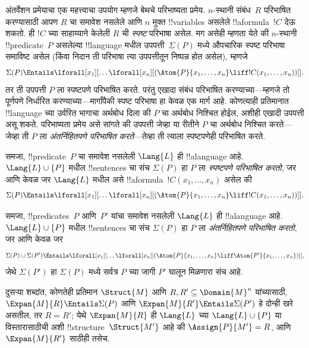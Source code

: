 \documentclass[../../../include/open-logic-section]{subfiles}
\begin{document}


अंतर्वेशन प्रमेयाचा एक महत्त्वाचा उपयोग म्हणजे बेथचे परिभाष्यता प्रमेय.
$n$-स्थानी संबंध~$R$ परिभाषित करण्यासाठी आपण $R$ चा समावेश नसलेले आणि
$n$ मुक्त !!{variable}s असलेले !!a{formula}~$!C$ देऊ शकतो. ही $!C$ च्या
साहाय्याने केलेली $R$ ची \emph{स्पष्ट} परिभाषा असेल. मग असेही म्हणता येते
की $n$-स्थानी !!{predicate}~$P$ असलेल्या !!{language} मधील
उपपत्ती~$\Sigma(P)$ मध्ये औपचारिक स्पष्ट परिभाषा समाविष्ट असेल (किंवा निदान
ती परिभाषा त्या उपपत्तीतून निष्पन्न होत असेल), म्हणजे
\[
\Sigma(P) \Entails \lforall[x_1][\dots
  \lforall[x_n][(\Atom{P}{x_1,\dots, x_n} \liff !C(x_1, \dots,
    x_n))]].
\]
तर ती उपपत्ती $P$ ला स्पष्टपणे परिभाषित करते. परंतु एखादा संबंध
परिभाषित करण्याच्या---म्हणजे तो पूर्णपणे निर्धारित करण्याच्या---मार्गांपैकी
स्पष्ट परिभाषा हा केवळ एक मार्ग आहे. कोणत्याही प्रतिमानात !!{language} च्या उर्वरित भागाचा अर्थबोध
दिला की $P$ चा अर्थबोध निश्चित होईल, अशीही एखादी उपपत्ती असू शकते.
परिभाष्यता प्रमेय असे सांगते की उपपत्ती जेव्हा या रीतीने $P$ चा अर्थबोध
निश्चित करते---जेव्हा ती $P$ ला \emph{अंतर्निहितपणे परिभाषित करते}---तेव्हा
ती त्याला स्पष्टपणेही परिभाषित करते.

\begin{defn}
समजा, !!{predicate}~$P$ चा समावेश नसलेली $\Lang{L}$ ही !!a{language} आहे. $\Lang{L}
\cup \{P\}$ मधील !!{sentence}s चा संच $\Sigma(P)$ हा $P$ ला
\emph{स्पष्टपणे परिभाषित करतो}, जर आणि केवळ जर $\Lang{L}$ मधील असे
!!a{formula}~$!C(x_1, \dots, x_n)$ असेल की
\[
\Sigma(P) \Entails \lforall[x_1][\dots
  \lforall[x_n][(\Atom{P}{x_1,\dots, x_n} \liff !C(x_1, \dots,
    x_n))]].
\]
\end{defn}

\begin{defn}
समजा, !!{predicate}s~$P$ आणि~$P'$ यांचा समावेश नसलेली
$\Lang{L}$ ही !!a{language} आहे. $\Lang{L} \cup \{P\}$ मधील
!!{sentence}s चा संच $\Sigma(P)$ हा $P$ ला \emph{अंतर्निहितपणे परिभाषित
करतो}, जर आणि केवळ जर
\[
\Sigma(P) \cup \Sigma(P') \Entails \lforall[x_1][\dots
  \lforall[x_n][(\Atom{P}{x_1,\dots, x_n} \liff \Atom{P'}{x_1,\dots,
      x_n})]],
\]
जेथे $\Sigma(P')$ हा $\Sigma(P)$ मध्ये सर्वत्र $P$ च्या जागी $P'$ घालून
मिळणारा संच आहे.
\end{defn}

दुसऱ्या शब्दांत, कोणतेही प्रतिमान $\Struct{M}$ आणि $R, R' \subseteq
\Domain{M}^n$ यांच्यासाठी, $\Expan{M}{R} \Entails \Sigma(P)$ आणि
$\Expan{M}{R'} \Entails \Sigma(P')$ हे दोन्ही खरे असतील, तर $R=R'$;
येथे $\Expan{M}{R}$ ही $\Lang{L}$ च्या $\Lang{L} \cup \{P\}$ या
विस्तारासाठीची अशी !!{structure}~$\Struct{M'}$ आहे की
$\Assign{P}{M'} = R$, आणि $\Expan{M}{R'}$ साठीही तसेच.
\end{document}
